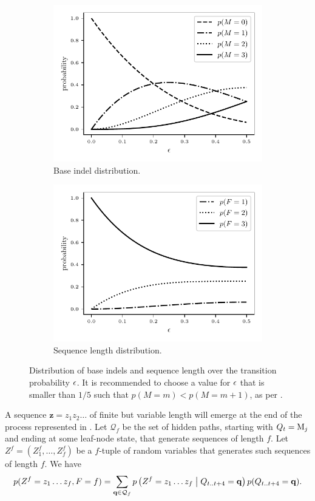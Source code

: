 \begin{figure}[htbp]
  \centering
  \captionsetup{width=0.85\linewidth}
  \begin{subfigure}{.5\linewidth}
    \centering
    \includegraphics[width=.7\linewidth]{figure/indel-prob}
    \caption{Base indel distribution.}%
    \label{fig:indel-dist}
  \end{subfigure}%
  \begin{subfigure}{.5\linewidth}
    \centering
    \includegraphics[width=.7\linewidth]{figure/seq-len-prob}
    \caption{Sequence length distribution.}%
    \label{fig:len-dist}
  \end{subfigure}
  \caption{
      Distribution of base indels and sequence length over the transition probability $\epsilon$.
      It is recommended to choose a value for $\epsilon$ that is smaller than $1/5$ such that
      $p(M=m)<p(M=m+1)$, as per .
  }\label{fig:dist}
\end{figure}

A sequence $\mathbf z=z_1 z_2\dots$ of finite but variable length will emerge at the end of the
process represented in .
Let $\mathcal Q_f$ be the set of hidden paths, starting with $Q_t=\mathrm{M}_j$ and ending at some leaf-node state,
that generate sequences of length $f$.
Let $Z^f=(Z^f_1, \dots, Z^f_f)$ be a $f$-tuple of random variables that generates such sequences of length $f$.
We have
\begin{equation*}
  p(Z^f=z_1\dots z_f,F=f) = \sum_{\mathbf q \in \mathcal Q_f}
  p\left(Z^f=z_1\dots z_f\;\middle|\; Q_{t..t+4}=\mathbf q\right) p(Q_{t..t+4}=\mathbf q).
\end{equation*}
